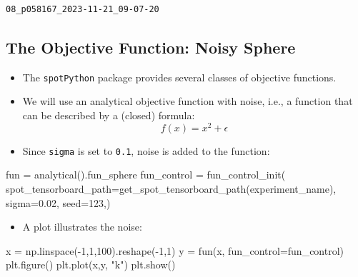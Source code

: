 \documentclass[
  letterpaper,
  DIV=11,
  numbers=noendperiod]{scrreprt}
\newenvironment{Shaded}{\begin{snugshade}}{\end{snugshade}}
\newcommand{\DecValTok}[1]{\textcolor[rgb]{0.68,0.00,0.00}{#1}}
\newcommand{\FloatTok}[1]{\textcolor[rgb]{0.68,0.00,0.00}{#1}}
\newcommand{\NormalTok}[1]{\textcolor[rgb]{0.00,0.23,0.31}{#1}}
\newcommand{\OperatorTok}[1]{\textcolor[rgb]{0.37,0.37,0.37}{#1}}
\newcommand{\StringTok}[1]{\textcolor[rgb]{0.13,0.47,0.30}{#1}}
\providecommand{\tightlist}{%
  \setlength{\itemsep}{0pt}\setlength{\parskip}{0pt}}\usepackage{longtable,booktabs,array}
\begin{document}
\begin{verbatim}
08_p058167_2023-11-21_09-07-20
\end{verbatim}

\hypertarget{the-objective-function-noisy-sphere}{%
\subsection{The Objective Function: Noisy
Sphere}\label{the-objective-function-noisy-sphere}}

\begin{itemize}
\item
  The \texttt{spotPython} package provides several classes of objective
  functions.
\item
  We will use an analytical objective function with noise, i.e., a
  function that can be described by a (closed) formula:
  \[f(x) = x^2 + \epsilon\]
\item
  Since \texttt{sigma} is set to \texttt{0.1}, noise is added to the
  function:
\end{itemize}

\begin{Shaded}
\begin{Highlighting}[]
\NormalTok{fun }\OperatorTok{=}\NormalTok{ analytical().fun\_sphere}
\NormalTok{fun\_control }\OperatorTok{=}\NormalTok{ fun\_control\_init(}
\NormalTok{    spot\_tensorboard\_path}\OperatorTok{=}\NormalTok{get\_spot\_tensorboard\_path(experiment\_name),}
\NormalTok{    sigma}\OperatorTok{=}\FloatTok{0.02}\NormalTok{,}
\NormalTok{    seed}\OperatorTok{=}\DecValTok{123}\NormalTok{,)}
\end{Highlighting}
\end{Shaded}

\begin{itemize}
\tightlist
\item
  A plot illustrates the noise:
\end{itemize}

\begin{Shaded}
\begin{Highlighting}[]
\NormalTok{x }\OperatorTok{=}\NormalTok{ np.linspace(}\OperatorTok{{-}}\DecValTok{1}\NormalTok{,}\DecValTok{1}\NormalTok{,}\DecValTok{100}\NormalTok{).reshape(}\OperatorTok{{-}}\DecValTok{1}\NormalTok{,}\DecValTok{1}\NormalTok{)}
\NormalTok{y }\OperatorTok{=}\NormalTok{ fun(x, fun\_control}\OperatorTok{=}\NormalTok{fun\_control)}
\NormalTok{plt.figure()}
\NormalTok{plt.plot(x,y, }\StringTok{"k"}\NormalTok{)}
\NormalTok{plt.show()}
\end{Highlighting}
\end{Shaded}
\end{document}
